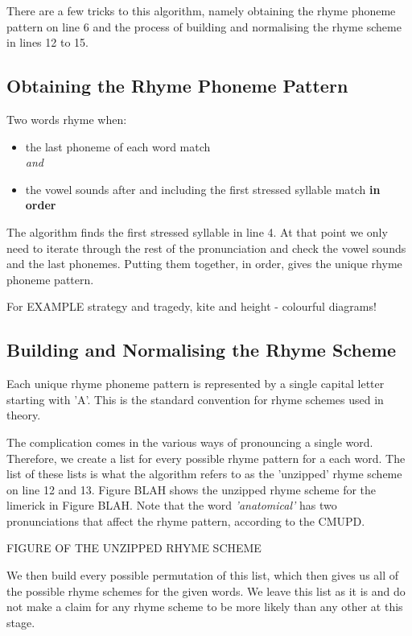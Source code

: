 There are a few tricks to this algorithm, namely obtaining the rhyme phoneme pattern on line 6 and the process of building and normalising the rhyme scheme in lines 12 to 15.

\subsection{Obtaining the Rhyme Phoneme Pattern}

Two words rhyme when:
\begin{itemize}
\item{the last phoneme of each word match \\\textit{and}}
\item{the vowel sounds after and including the first stressed syllable match \textbf{in order}}
\end{itemize}

The algorithm finds the first stressed syllable in line 4. At that point we only need to iterate through the rest of the pronunciation and check the vowel sounds and the last phonemes. Putting them together, in order, gives the unique rhyme phoneme pattern. 

For EXAMPLE strategy and tragedy, kite and height - colourful diagrams!			

\subsection{Building and Normalising the Rhyme Scheme}

Each unique rhyme phoneme pattern is represented by a single capital letter starting with 'A'. This is the standard convention for rhyme schemes used in theory. 

The complication comes in the various ways of pronouncing a single word. Therefore, we create a list for every possible rhyme pattern for a each word. The list of these lists is what the algorithm refers to as the 'unzipped' rhyme scheme on line 12 and 13. Figure BLAH shows the unzipped rhyme scheme for the limerick in Figure BLAH. Note that the word \textit{'anatomical'} has two pronunciations that affect the rhyme pattern, according to the CMUPD.

FIGURE OF THE UNZIPPED RHYME SCHEME

We then build every possible permutation of this list, which then gives us all of the possible rhyme schemes for the given words. We leave this list as it is and do not make a claim for any rhyme scheme to be more likely than any other at this stage.

